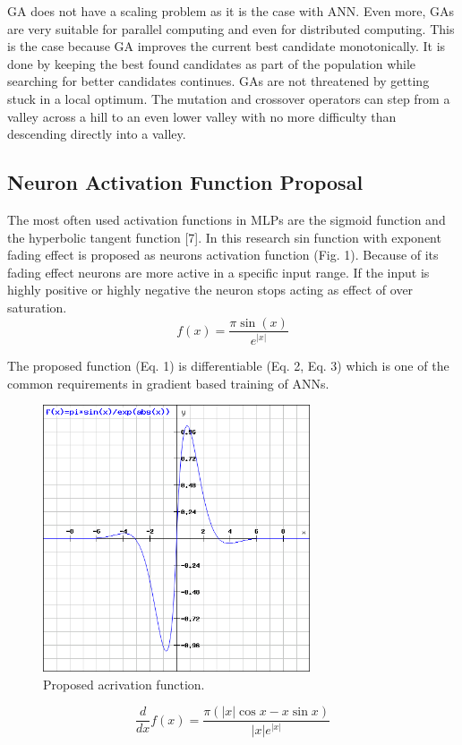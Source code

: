 \documentclass{llncs}
\begin{document}
GA does not have a scaling problem as it is the case with ANN. Even more, GAs are very suitable for parallel computing and even for distributed computing. This is the case because GA improves the current best candidate monotonically. It is done by keeping the best found candidates as part of the population while searching for better candidates continues. GAs are not threatened by getting stuck in a local optimum. The mutation and crossover operators can step from a valley across a hill to an even lower valley with no more difficulty than descending directly into a valley.
%
\subsection{Neuron Activation Function Proposal}
%
The most often used activation functions in MLPs are the sigmoid function and the hyperbolic tangent function [7]. In this research sin function with exponent fading effect is proposed as neurons activation function (Fig. 1). Because of its fading effect neurons are more active in a specific input range. If the input is highly positive or highly negative the neuron stops acting as effect of over saturation.
%
\begin{equation}
f(x) = \frac {\pi \sin(x)} { e^{ |x| }}
\end{equation}

The proposed function (Eq. 1) is differentiable (Eq. 2, Eq. 3) which is one of the common requirements in gradient based training of ANNs.
%
\begin{figure}
	\centering
	\includegraphics[width=7.88cm,height=7.88cm]{fig03.png}
	\caption{Proposed acrivation function.}
	\label{fig:Graph}
\end{figure}
\FloatBarrier
%
\begin{equation}
\frac{d}{dx}f(x) = \frac {\pi (|x|\cos x - x\sin x)} { |x| e^{ |x| } }
\end{equation}
\end{document}
